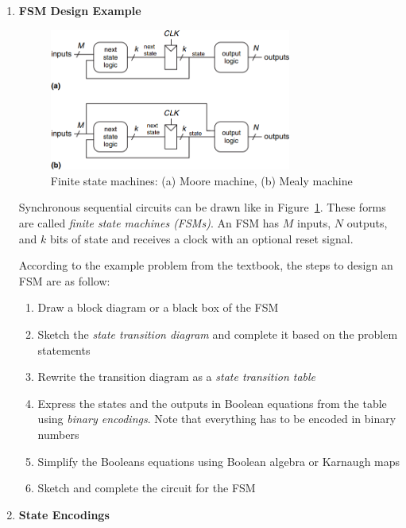 \documentclass[12pt]{article}
\begin{document}
\begin{enumerate}
  \item \textbf{FSM Design Example}

  \begin{figure}[h]
    \centering
    \includegraphics[width=0.75\textwidth]{moore_and_mealy_fsm.png}
    \caption{Finite state machines: (a) Moore machine, (b) Mealy machine}
    \label{figure:12}
  \end{figure}

  Synchronous sequential circuits can be drawn like in Figure~\ref{figure:12}. These forms are called \textit{finite state machines (FSMs)}. An FSM has $M$ inputs, $N$ outputs, and $k$ bits of state and receives a clock with an optional reset signal.

  According to the example problem from the textbook, the steps to design an FSM are as follow:

  \begin{enumerate}
    \item Draw a block diagram or a black box of the FSM
    \item Sketch the \textit{state transition diagram} and complete it based on the problem statements
    \item Rewrite the transition diagram as a \textit{state transition table}
    \item Express the states and the outputs in Boolean equations from the table using \textit{binary encodings}. Note that everything has to be encoded in binary numbers
    \item Simplify the Booleans equations using Boolean algebra or Karnaugh maps
    \item Sketch and complete the circuit for the FSM
  \end{enumerate}

  \item \textbf{State Encodings}


\end{enumerate}
\end{document}
